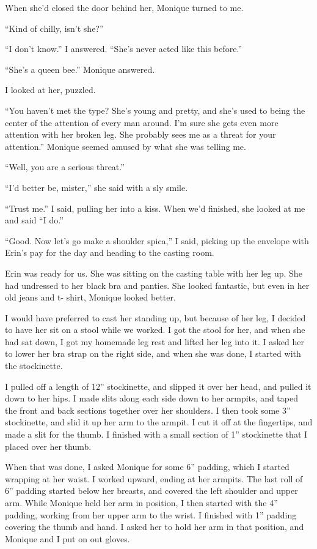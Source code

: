 When she'd closed the door behind her, Monique turned to me.

``Kind of chilly, isn't she?''

``I don't know.'' I answered. ``She's never acted like this before.''

``She's a queen bee.'' Monique answered.

I looked at her, puzzled.

``You haven't met the type? She's young and pretty, and she's used to being the center of
the attention of every man around. I'm sure she gets even more attention with her broken leg.
She probably sees me as a threat for your attention.'' Monique seemed amused by what she was
telling me.

``Well, you are a serious threat.''

``I'd better be, mister,'' she said with a sly smile.

``Trust me.'' I said, pulling her into a kiss. When we'd finished, she looked at me and said
``I do.''

``Good. Now let's go make a shoulder spica,'' I said, picking up the envelope with Erin's pay
for the day and heading to the casting room.

Erin was ready for us. She was sitting on the casting table with her leg up. She had
undressed to her black bra and panties. She looked fantastic, but even in her old jeans and t-
shirt, Monique looked better.

I would have preferred to cast her standing up, but because of her leg, I decided to have
her sit on a stool while we worked. I got the stool for her, and when she had sat down, I got my
homemade leg rest and lifted her leg into it. I asked her to lower her bra strap on the right
side, and when she was done, I started with the stockinette.

I pulled off a length of 12'' stockinette, and slipped it over her head, and pulled it down
to her hips. I made slits along each side down to her armpits, and taped the front and back
sections together over her shoulders. I then took some 3'' stockinette, and slid it up her arm
to
the armpit. I cut it off at the fingertips, and made a slit for the thumb. I finished with a
small section of 1'' stockinette that I placed over her thumb.

When that was done, I asked Monique for some 6'' padding, which I started wrapping at her
waist. I worked upward, ending at her armpits. The last roll of 6'' padding started below her
breasts, and covered the left shoulder and upper arm. While Monique held her arm in position, I
then started with the 4'' padding, working from her upper arm to the wrist. I finished with 1''
padding covering the thumb and hand. I asked her to hold her arm in that position, and Monique
and I put on out gloves.

